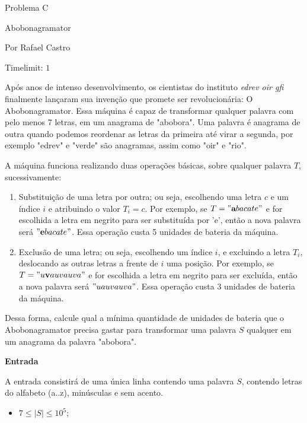 \begin{center}
Problema C

Abobonagramator

{\tiny Por Rafael Castro}

Timelimit: $1$	
\end{center}			
			
Após anos de intenso desenvolvimento, os cientistas do instituto 
\textit{edrev oir gfi}
finalmente lançaram sua invenção que promete ser revolucionária: O Abobonagramator. Essa máquina é capaz de transformar qualquer palavra com pelo menos 7 letras, em um anagrama de "abobora". Uma palavra é anagrama de outra quando podemos reordenar as letras da primeira até virar a segunda, por exemplo "edrev" e "verde" são anagramas, assim como "oir" e "rio".
 
    A máquina funciona realizando duas operações básicas, sobre qualquer palavra $T$, sucessivamente:

    \begin{enumerate}
        \item Substituição de uma letra por outra; ou seja, escolhendo uma letra $c$ e um índice $i$ e atribuindo o valor $T_i = c$. Por exemplo, se $T = "\textbf{a}bacate"$ e for escolhida a letra em negrito para ser substituída por 'e', então a nova palavra será $"\textbf{e}bacate"$. Essa operação custa 5 unidades de bateria da máquina. 
        
        \item Exclusão de uma letra; ou seja, escolhendo um índice $i$, e excluindo a letra $T_i$, deslocando as outras letras a frente de $i$ uma posição. Por exemplo, se $T = "u\textbf{v}auvauva"$ e for escolhida a letra em negrito para ser excluída, então a nova palavra será $"uauvauva"$. Essa operação custa 3 unidades de bateria da máquina.
    \end{enumerate}

    Dessa forma, calcule qual a mínima quantidade de unidades de bateria que o Abobonagramator precisa gastar para transformar uma palavra $S$ qualquer em um anagrama da palavra "abobora".

\vspace{0.3cm}
\textbf{Entrada}

A entrada consistirá de uma única linha contendo uma palavra $S$, contendo letras do alfabeto (a..z), minúsculas e sem acento.
\begin{itemize}
\item $7 \leqslant |S| \leqslant 10^{5}$;
\end{itemize}

